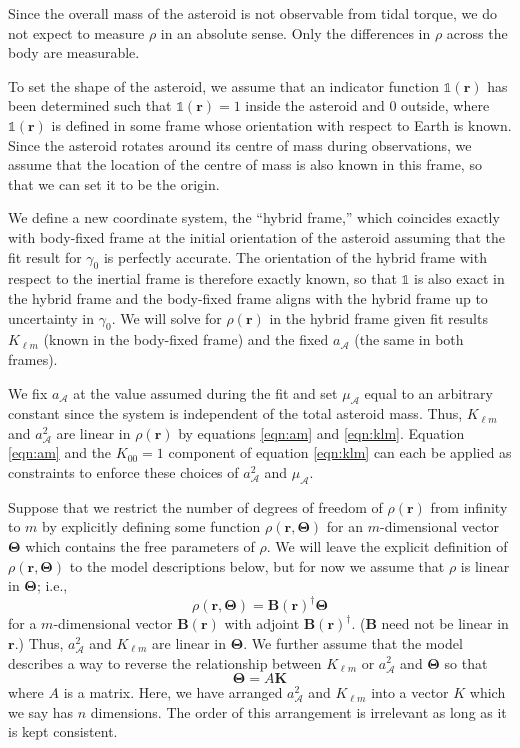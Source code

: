 \documentclass[fleqn,usenatbib]{mnras}
\begin{document}
Since the overall mass of the asteroid is not observable from tidal torque, we do not expect to measure $\rho$ in an absolute sense. Only the differences in $\rho$ across the body are measurable.

To set the shape of the asteroid, we assume that an indicator function $\mathds{1}(\bm r)$ has been determined such that $\mathds{1}(\bm r) = 1$ inside the asteroid and 0 outside, where $\mathds{1}(\bm r)$ is defined in some frame whose orientation with respect to Earth is known. Since the asteroid rotates around its centre of mass during observations, we assume that the location of the centre of mass is also known in this frame, so that we can set it to be the origin.

We define a new coordinate system, the ``hybrid frame,'' which coincides exactly with body-fixed frame at the initial orientation of the asteroid assuming that the fit result for $\gamma_0$ is perfectly accurate. The orientation of the hybrid frame with respect to the inertial frame is therefore exactly known, so that $\mathds{1}$ is also exact in the hybrid frame and the body-fixed frame aligns with the hybrid frame up to uncertainty in $\gamma_0$. We will solve for $\rho(\bm r)$ in the hybrid frame given fit results $K_{\ell m}$ (known in the body-fixed frame) and the fixed $a_\mathcal{A}$ (the same in both frames).

We fix $a_\mathcal{A}$ at the value assumed during the fit and set $\mu_\mathcal{A}$ equal to an arbitrary constant since the system is independent of the total asteroid mass. Thus, $K_{\ell m}$ and $a_\mathcal{A}^2$ are linear in $\rho(\bm r)$ by equations \ref{eqn:am} and \ref{eqn:klm}. Equation \ref{eqn:am} and the $K_{00}=1$ component of equation \ref{eqn:klm} can each be applied as constraints to enforce these choices of $a_\mathcal{A}^2$ and $\mu_\mathcal{A}$.

Suppose that we restrict the number of degrees of freedom of $\rho(\bm r)$ from infinity to $m$ by explicitly defining some function $\rho(\bm r, \bm \Theta)$ for an $m$-dimensional vector $\bm \Theta$ which contains the free parameters of $\rho$. We will leave the explicit definition of $\rho(\bm r, \bm \Theta)$ to the model descriptions below, but for now we assume that $\rho$ is linear in $\bm \Theta$; i.e.,
\begin{equation}
  \rho(\bm r, \bm \Theta) = \bm B(\bm r)^\dagger \bm \Theta
  \label{eqn:density-distro}
\end{equation}
for a $m$-dimensional vector $\bm B(\bm r)$ with adjoint $\bm B(\bm r)^\dagger$. ($\bm B$ need not be linear in $\bm r$.) Thus, $a_\mathcal{A}^2$ and $K_{\ell m}$ are linear in $\bm \Theta$. We further assume that the model describes a way to reverse the relationship between $K_{\ell m}$ or $a_\mathcal{A}^2$ and $\bm \Theta$ so that
\begin{equation}
  \bm \Theta = A \bm K
  \label{eqn:density-model}
\end{equation}
where $A$ is a matrix. Here, we have arranged $a_\mathcal{A}^2$ and $K_{\ell m}$ into a vector $K$ which we say has $n$ dimensions. The order of this arrangement is irrelevant as long as it is kept consistent.
\end{document}

